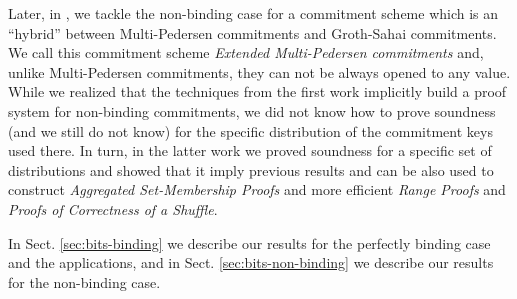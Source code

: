 Later, in \cite{ACNS:GonRaf16}, we tackle the non-binding case for a commitment scheme which is an ``hybrid'' between Multi-Pedersen commitments and Groth-Sahai commitments. We call this commitment scheme \emph{Extended Multi-Pedersen commitments} and, unlike Multi-Pedersen commitments, they can not be always opened to any value. 
While we realized that the techniques from the first work implicitly build a proof system for non-binding commitments, we did not know how to prove soundness (and we still do not know) for the specific distribution of the commitment keys used there. In turn, in the latter work we proved soundness for a specific set of distributions and showed that it imply previous results and can be also used to construct \emph{Aggregated Set-Membership Proofs} and more efficient \emph{Range Proofs} and \emph{Proofs of Correctness of a Shuffle}.

In Sect. \ref{sec:bits-binding} we describe our results for the perfectly binding case and the applications, and in Sect. \ref{sec:bits-non-binding} we describe our results for the non-binding case.
